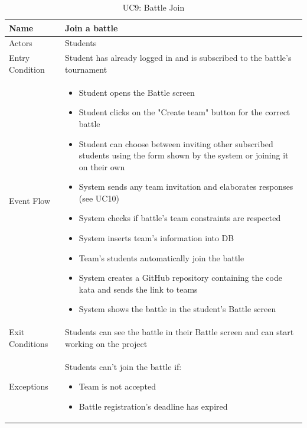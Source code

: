 \begin{enumerate}
   \begin{table}[H]
       \centering
       \begin{tabular}{|l|m{11cm}|}
        \hline
            Name & Join a battle\\
        \hline
            Actors & Students\\
        \hline
            Entry Condition & Student has already logged in and is subscribed to the battle's tournament\\
        \hline
            Event Flow & 
            \begin{itemize}
                \item Student opens the Battle screen
                \item Student clicks on the "Create team" button for the correct battle
                \item Student can choose between inviting other subscribed students using the form shown by the system or joining it on their own
                \item System sends any team invitation and elaborates responses (see UC10) \item System checks if battle's team constraints are respected
                \item System inserts team's information into DB
                \item Team's students automatically join the battle
                \item System creates a GitHub repository containing the code kata and sends the link to teams
                \item System shows the battle in the student's Battle screen                
            \end{itemize}\\
        \hline
            Exit Conditions & Students can see the battle in their Battle screen and can start working on the project\\
        \hline
            Exceptions & Students can't join the battle if: 
            \begin{itemize}
                \item Team is not accepted
                \item Battle registration's deadline has expired
            \end{itemize}\\
        \hline
       \end{tabular}
       \caption{UC9: Battle Join}
       \label{tab:uc9}
   \end{table}



\end{enumerate}

